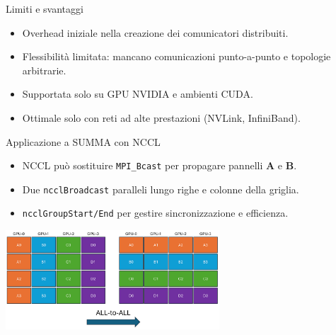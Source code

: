 \documentclass{beamer}
\begin{document}
\begin{frame}{Limiti e svantaggi}
    \begin{itemize}
        \item Overhead iniziale nella creazione dei comunicatori distribuiti.
        \item Flessibilità limitata: mancano comunicazioni punto-a-punto e topologie arbitrarie.
        \item Supportata solo su GPU NVIDIA e ambienti CUDA.
        \item Ottimale solo con reti ad alte prestazioni (NVLink, InfiniBand).
    \end{itemize}
\end{frame}

\begin{frame}{Applicazione a SUMMA con NCCL}
    \begin{itemize}
        \item NCCL può sostituire \texttt{MPI\_Bcast} per propagare pannelli $\mathbf{A}$ e $\mathbf{B}$.
        \item Due \texttt{ncclBroadcast} paralleli lungo righe e colonne della griglia.
        \item \texttt{ncclGroupStart/End} per gestire sincronizzazione e efficienza.
    \end{itemize}

    \includegraphics[width=0.6\textwidth]{imgs/summa_nccl.png}
\end{frame}
\end{document}

